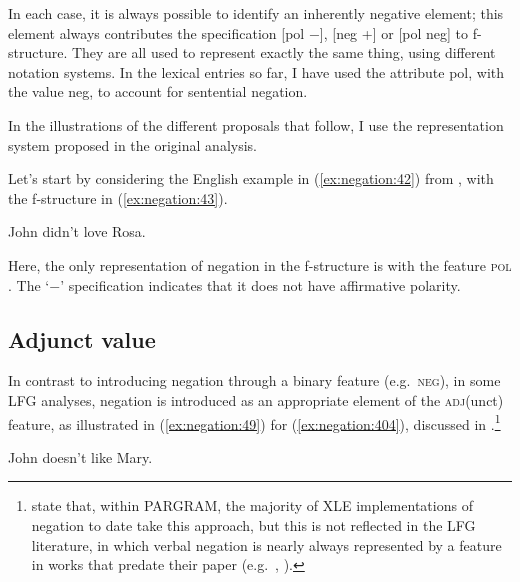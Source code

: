 \documentclass[output=paper,hidelinks]{langscibook}
\begin{document}
In each case, it is always possible to identify an inherently negative element; this element always contributes the specification [{\sc pol $-$}],  [{\sc neg +}] or   [{\sc pol neg}] to f\nobreakdashes-structure. 
They are all used to represent exactly the same thing, using different notation systems. In the lexical entries so far, I have used the attribute {\sc pol}, with the value {\sc neg}, to account for sentential negation.

In the illustrations of the different proposals that follow, I use the representation system proposed in the original analysis.

Let's start by considering the English example in (\ref{ex:negation:42}) from \citet [87]{DN}, with the f\nobreakdashes-structure in (\ref{ex:negation:43}). 

\ea
\label{ex:negation:42}
John didn't love Rosa.
\z

\ea\label{ex:negation:43}
\z

Here, the only representation of negation in the f-structure is with the feature \textsc{pol}  \citep [87]{DN}. The `$-$' specification indicates that it does not have affirmative polarity.

\subsection{Adjunct value}
\label{sec:negation:adjunct}

In contrast to introducing negation through a binary feature (e.g.\ \textsc{neg}), in some LFG analyses, negation is introduced as an appropriate element of the \textsc{adj}(unct) feature, as illustrated in (\ref{ex:negation:49}) for (\ref{ex:negation:404}), discussed in \citet [323--324] {przepiorkowski2015two}.\footnote{\citet {przepiorkowski2015two} state that, within PARGRAM, the majority of XLE implementations of negation to date take this approach, but this is not reflected in the LFG literature, in which verbal negation is nearly always represented by a feature in works that predate their paper (e.g.\ \citealt{sellsneg}, \citealt{AlsharifSadler:09}).}
 
\ea
\label{ex:negation:404}
John doesn't like Mary.
\z
 
\end{document}
